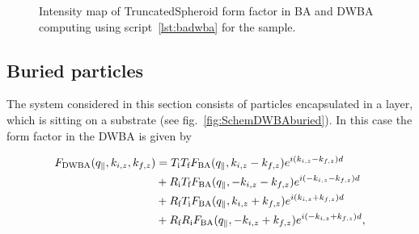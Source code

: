 \begin{figure}[ht]
\hfill
{}
\hfill
{}
\hfill
\caption{Intensity map of TruncatedSpheroid form factor in BA and DWBA computing using script~\ref{lst:badwba} for the sample.}
\label{fig:spheroidbadwba}
\end{figure}

\FloatBarrier 


\subsection{Buried particles} 

The system considered in this section consists of particles encapsulated in a layer, which is sitting on a substrate (see fig.~\ref{fig:SchemDWBAburied}). In this case the form factor in the DWBA is given by

\begin{align}
  F_{\rm{DWBA}}(q_{\parallel}, k_{i,z}, k_{f,z})
  &= T_\text{i} T_\text{f} F_{\rm{BA}}(q_{\parallel}, k_{i,z}-k_{f,z})e^{i(k_{i,z}-k_{f,z})d}\nonumber \\
  &+ R_\text{i} T_\text{f} F_{\rm{BA}}(q_{\parallel}, -k_{i,z}-k_{f,z})e^{i(-k_{i,z}-k_{f,z})d} \nonumber \\
  &+ R_\text{f} T_\text{i} F_{\rm{BA}}(q_{\parallel}, k_{i,z}+k_{f,z}) e^{i(k_{i,z}+k_{f,z})d}\nonumber \\
  &+ R_\text{f} R_\text{i}F_{\rm{BA}}(q_{\parallel},-k_{i,z}+k_{f,z})e^{i(-k_{i,z}+k_{f,z})d}, \label{Edwbaburied}
\end{align}

